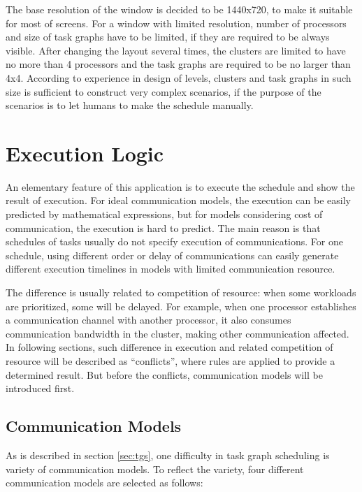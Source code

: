 \documentclass[msc,deptreport, cs]{infthesis}
\begin{document}
The base resolution of the window is decided to be 1440x720, to make it suitable for most of screens. For a window with limited resolution, number of processors and size of task graphs have to be limited, if they are required to be always visible. After changing the layout several times, the clusters are limited to have no more than 4 processors and the task graphs are required to be no larger than 4x4. According to experience in design of levels, clusters and task graphs in such size is sufficient to construct very complex scenarios, if the purpose of the scenarios is to let humans to make the schedule manually.

\section{Execution Logic} \label{sec:execution}

An elementary feature of this application is to execute the schedule and show the result of execution. For ideal communication models, the execution can be easily predicted by mathematical expressions, but for models considering cost of communication, the execution is hard to predict. The main reason is that schedules of tasks usually do not specify execution of communications. For one schedule, using different order or delay of communications can easily generate different execution timelines in models with limited communication resource. 

The difference is usually related to competition of resource: when some workloads are prioritized, some will be delayed. For example, when one processor establishes a communication channel with another processor, it also consumes communication bandwidth in the cluster, making other communication affected. In following sections, such difference in execution and related competition of resource will be described as ``conflicts'', where rules are applied to provide a determined result. But before the conflicts, communication models will be introduced first.

\subsection{Communication Models} \label{sec:comm}

As is described in section \ref{sec:tgs}, one difficulty in task graph scheduling is variety of communication models. To reflect the variety, four different communication models are selected as follows:
\end{document}
